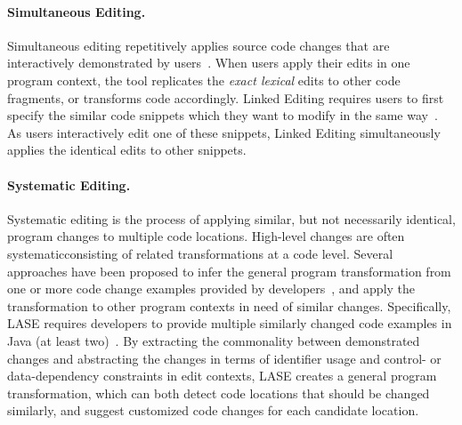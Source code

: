 \paragraph{Simultaneous Editing.}
Simultaneous editing repetitively applies source code changes that are interactively demonstrated by users~\cite{MiM2001}. When users apply their edits in one program context, the tool replicates the \emph{exact lexical} edits to other code fragments, or transforms code accordingly. Linked Editing requires users to first specify the similar code snippets which they want to modify in the same way~\cite{TBG2004}. As users interactively edit one of these snippets, Linked Editing simultaneously applies the identical edits to other snippets. 

\paragraph{Systematic Editing.} 
Systematic editing is the process of applying similar, but not necessarily identical, program changes to multiple code locations. High-level changes are often systematic\textemdash consisting of related transformations at a code level. Several approaches have been proposed to infer the general program transformation from one or more code change examples provided by developers~\cite{MKM2011,Meng12:lase,Rolim:2017}, and apply the transformation to other program contexts in need of similar changes. Specifically, LASE requires developers to provide multiple similarly changed code examples in Java (at least two)~\cite{Meng12:lase}. By extracting the commonality between demonstrated changes and abstracting the changes in terms of identifier usage and control- or data-dependency constraints in edit contexts, LASE creates a general program transformation, which can both detect code locations that should be changed similarly, and suggest customized code changes for each candidate location.


